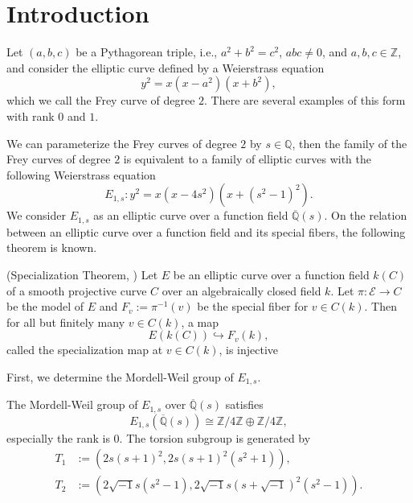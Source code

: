 \documentclass[main]{subfiles}
\begin{document}
\section{Introduction}
Let $(a,b,c)$ be a Pythagorean triple, i.e., $a^{2} + b^{2} = c^{2}$, $abc\neq0$, and $a,b,c \in \mathbb{Z}$, and consider the elliptic curve defined by a Weierstrass equation
\begin{equation*}
    y^{2} = x(x - a^{2})(x + b^{2}),
\end{equation*}
which we call the Frey curve of degree $2$.
There are several examples of this form with rank $0$ and $1$.

We can parameterize the Frey curves of degree $2$ by $s \in \mathbb{Q}$, then the family of the Frey curves of degree $2$ is equivalent to a family of elliptic curves with the following Weierstrass equation
\begin{equation*}
    E_{1,s}: y^{2} = x(x - 4s^{2})(x + (s^{2} - 1)^{2}).
\end{equation*}
We consider $E_{1,s}$ as an elliptic curve over a function field $\overline{\mathbb{Q}}(s)$.
On the relation between an elliptic curve over a function field and its special fibers, the following theorem is known.
\begin{thm}{(Specialization Theorem, \cite[Theorem 11.4.]{ref:advancedaec})}
    \label{thm:specialization}
    Let $E$ be an elliptic curve over a function field $k(C)$ of a smooth projective curve $C$ over an algebraically closed field $k$.
    Let $\pi: \mathcal{E} \to C$ be the \Neron{} model of $E$ and $F_v:=\pi^{-1}(v)$ be the special fiber for $v \in C(k)$.
    Then for all but finitely many $v \in C(k)$, a map
    \begin{equation*}
        E(k(C)) \hookrightarrow F_{v}(k),
    \end{equation*}
    called the specialization map at $v \in C(k)$, is injective
\end{thm}

First, we determine the Mordell-Weil group of $E_{1,s}$.

\begin{thm}
    \label{thm:E_{1,s}}
    The Mordell-Weil group of $E_{1,s}$ over $\overline{\mathbb{Q}}(s)$ satisfies
    \begin{equation*}
        E_{1,s}(\overline{\mathbb{Q}}(s)) \cong \mathbb{Z} / 4 \mathbb{Z} \oplus \mathbb{Z} / 4 \mathbb{Z},
    \end{equation*}
    especially the rank is $0$. The torsion subgroup is generated by
    \begin{align}
        T_1 & := (2s(s+1)^2, 2s(s+1)^2(s^2+1)),                              \\
        T_2 & := (2 \sqrt{-1} s(s^2-1),2 \sqrt{-1} s(s+\sqrt{-1})^2(s^2-1)).
    \end{align}
\end{thm}
\end{document}
